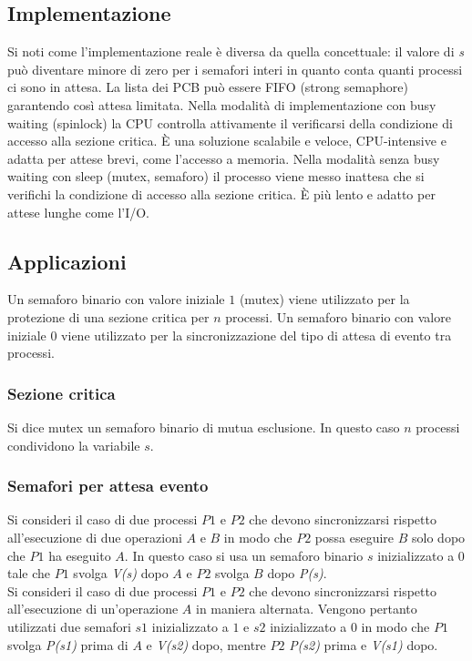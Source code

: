 \subsection{Implementazione}
Si noti come l'implementazione reale \`e diversa da quella concettuale: il valore di \emph{s} pu\`o diventare minore di zero per i semafori interi in quanto conta quanti processi ci 
sono in attesa. La lista dei PCB pu\`o essere FIFO (strong semaphore) garantendo cos\`i attesa limitata. Nella modalit\`a di implementazione con busy waiting (spinlock) la CPU controlla
attivamente il verificarsi della condizione di accesso alla sezione critica. \`E una soluzione scalabile e veloce, CPU-intensive e adatta per attese brevi, come l'accesso a memoria.
Nella modalit\`a senza busy waiting con sleep (mutex, semaforo) il processo viene messo inattesa che si verifichi la condizione di accesso alla sezione critica. \`E pi\`u lento e 
adatto per attese lunghe come l'I/O.
\subsection{Applicazioni}
Un semaforo binario con valore iniziale $1$ (mutex) viene utilizzato per la protezione di una sezione critica per $n$ processi. Un semaforo binario con valore iniziale $0$ viene 
utilizzato per la sincronizzazione del tipo di attesa di evento tra processi.
\subsubsection{Sezione critica}
Si dice mutex un semaforo binario di mutua esclusione. In questo caso $n$ processi condividono la variabile $s$.

\subsubsection{Semafori per attesa evento}
Si consideri il caso di due processi $P1$ e $P2$ che devono sincronizzarsi rispetto all'esecuzione di due operazioni $A$ e $B$ in modo che $P2$ possa eseguire $B$ solo dopo che $P1$
ha eseguito $A$. In questo caso si usa un semaforo binario $s$ inizializzato a $0$ tale che $P1$ svolga \emph{V(s)} dopo $A$ e $P2$ svolga $B$ dopo \emph{P(s)}.\\
Si consideri il caso di due processi $P1$ e $P2$ che devono sincronizzarsi rispetto all'esecuzione di un'operazione $A$ in maniera alternata. Vengono pertanto utilizzati due semafori 
$s1$ inizializzato a $1$ e $s2$ inizializzato a $0$ in modo che $P1$ svolga \emph{P(s1)} prima di $A$ e \emph{V(s2)} dopo, mentre $P2$ \emph{P(s2)} prima e \emph{V(s1)} dopo. 
